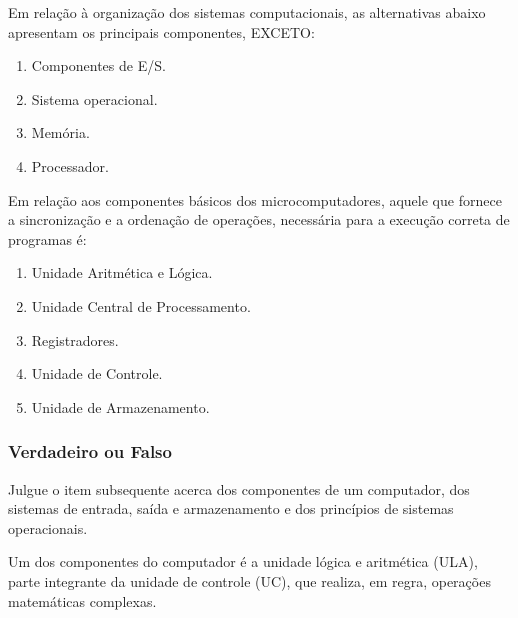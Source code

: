 \documentclass[aspectratio=169,
				xcolor=table]{beamer}
\begin{document}
	\begin{frame}
		Em relação à organização dos sistemas computacionais, as alternativas abaixo apresentam os principais componentes, EXCETO: 
		
		\vspace{1em}
		\begin{enumerate}[a]
			\normalsize
			\item Componentes de E/S.
			\item Sistema operacional.
			\item Memória.
			\item Processador.
		\end{enumerate}
	\end{frame}

	\begin{frame}
		Em relação aos componentes básicos dos microcomputadores, aquele que fornece a sincronização e a ordenação de operações, necessária para a execução correta de programas é: 
		
		\vspace{1em}
		\begin{enumerate}[a]
			\normalsize
			\item  Unidade Aritmética e Lógica.
			\item  Unidade Central de Processamento. 
			\item  Registradores.
			\item  Unidade de Controle.
			\item  Unidade de Armazenamento. 
		\end{enumerate}

	\end{frame}
	
	\begin{frame}
		\frametitle{Verdadeiro ou Falso}
		Julgue o item subsequente acerca dos componentes de um computador, dos sistemas de entrada, saída e armazenamento e dos princípios de sistemas operacionais. 
		
		\vspace{1em}
		Um dos componentes do computador é a unidade lógica e aritmética (ULA), parte integrante da unidade de controle (UC), que realiza, em regra, operações matemáticas complexas.

	\end{frame}
	
\end{document}
